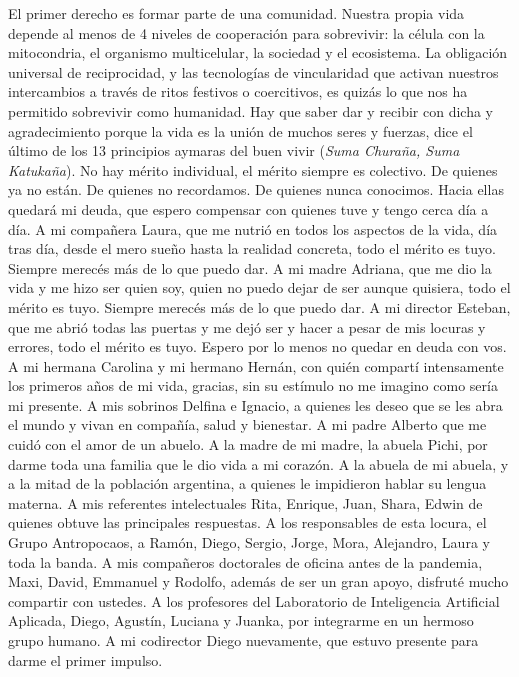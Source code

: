 \documentclass[a4paper,11pt]{book}
\theoremstyle{definition}
\begin{document}
El primer derecho es formar parte de una comunidad.
%
Nuestra propia vida depende al menos de 4 niveles de cooperación para sobrevivir: la célula con la mitocondria, el organismo multicelular, la sociedad y el ecosistema.
%
La obligación universal de reciprocidad, y las tecnologías de vincularidad que activan nuestros intercambios a través de ritos festivos o coercitivos, es quizás lo que nos ha permitido sobrevivir como humanidad.
%
Hay que saber dar y recibir con dicha y agradecimiento porque la vida es la unión de muchos seres y fuerzas, dice el último de los 13 principios aymaras del buen vivir (\emph{Suma Churaña, Suma Katukaña}).
%
No hay mérito individual, el mérito siempre es colectivo.
%
De quienes ya no están.
%
De quienes no recordamos.
%
De quienes nunca conocimos.
%
Hacia ellas quedará mi deuda, que espero compensar con quienes tuve y tengo cerca día a día.
%
A mi compañera Laura, que me nutrió en todos los aspectos de la vida, día tras día, desde el mero sueño hasta la realidad concreta, todo el mérito es tuyo. Siempre merecés más de lo que puedo dar.
%
A mi madre Adriana, que me dio la vida y me hizo ser quien soy, quien no puedo dejar de ser aunque quisiera, todo el mérito es tuyo. Siempre merecés más de lo que puedo dar.
%
A mi director Esteban, que me abrió todas las puertas y me dejó ser y hacer a pesar de mis locuras y errores, todo el mérito es tuyo. Espero por lo menos no quedar en deuda con vos.
%
A mi hermana Carolina y mi hermano Hernán, con quién compartí intensamente los primeros años de mi vida, gracias, sin su estímulo no me imagino como sería mi presente.
%
A mis sobrinos Delfina e Ignacio, a quienes les deseo que se les abra el mundo y vivan en compañía, salud y bienestar.
%
A mi padre Alberto que me cuidó con el amor de un abuelo.
%
A la madre de mi madre, la abuela Pichi, por darme toda una familia que le dio vida a mi corazón.
%
A la abuela de mi abuela, y a la mitad de la población argentina, a quienes le impidieron hablar su lengua materna.
%
A mis referentes intelectuales Rita, Enrique, Juan, Shara, Edwin de quienes obtuve las principales respuestas.
%
A los responsables de esta locura, el Grupo Antropocaos, a Ramón, Diego, Sergio, Jorge, Mora, Alejandro, Laura y toda la banda.
%
A mis compañeros doctorales de oficina antes de la pandemia, Maxi, David, Emmanuel y Rodolfo, además de ser un gran apoyo, disfruté mucho compartir con ustedes.
%
A los profesores del Laboratorio de Inteligencia Artificial Aplicada, Diego, Agustín, Luciana y Juanka, por integrarme en un hermoso grupo humano.
%
A mi codirector Diego nuevamente, que estuvo presente para darme el primer impulso.
\end{document}
